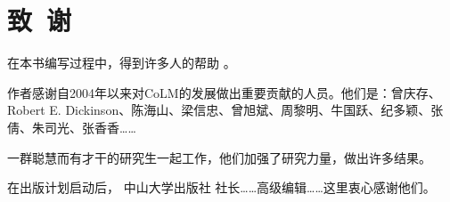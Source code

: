 \chapter*{致~谢}

在本书编写过程中，得到许多人的帮助 。

作者感谢自2004年以来对CoLM的发展做出重要贡献的人员。他们是：曾庆存、Robert E. Dickinson、陈海山、梁信忠、曾旭斌、周黎明、牛国跃、纪多颖、张倩、朱司光、张香香……

一群聪慧而有才干的研究生一起工作，他们加强了研究力量，做出许多结果。

在出版计划启动后， 中山大学出版社 社长……高级编辑……这里衷心感谢他们。